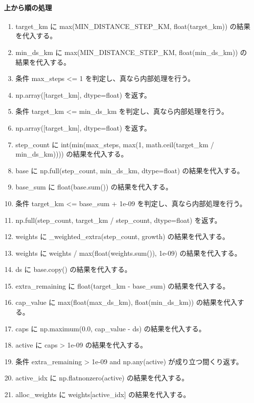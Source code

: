 \documentclass[a4paper,11pt]{article}
\begin{document}
            \paragraph{上から順の処理}
            \begin{enumerate}[leftmargin=1.8em]
            \item target\_km に max(MIN\_DISTANCE\_STEP\_KM, float(target\_km)) の結果を代入する。
\item min\_ds\_km に max(MIN\_DISTANCE\_STEP\_KM, float(min\_ds\_km)) の結果を代入する。
\item 条件 max\_steps <= 1 を判定し、真なら内部処理を行う。
\item   np.array([target\_km], dtype=float) を返す。
\item 条件 target\_km <= min\_ds\_km を判定し、真なら内部処理を行う。
\item   np.array([target\_km], dtype=float) を返す。
\item step\_count に int(min(max\_steps, max(1, math.ceil(target\_km / min\_ds\_km)))) の結果を代入する。
\item base に np.full(step\_count, min\_ds\_km, dtype=float) の結果を代入する。
\item base\_sum に float(base.sum()) の結果を代入する。
\item 条件 target\_km <= base\_sum + 1e-09 を判定し、真なら内部処理を行う。
\item   np.full(step\_count, target\_km / step\_count, dtype=float) を返す。
\item weights に \_weighted\_extra(step\_count, growth) の結果を代入する。
\item weights に weights / max(float(weights.sum()), 1e-09) の結果を代入する。
\item ds に base.copy() の結果を代入する。
\item extra\_remaining に float(target\_km - base\_sum) の結果を代入する。
\item cap\_value に max(float(max\_ds\_km), float(min\_ds\_km)) の結果を代入する。
\item caps に np.maximum(0.0, cap\_value - ds) の結果を代入する。
\item active に caps > 1e-09 の結果を代入する。
\item 条件 extra\_remaining > 1e-09 and np.any(active) が成り立つ間くり返す。
\item   active\_idx に np.flatnonzero(active) の結果を代入する。
\item   alloc\_weights に weights[active\_idx] の結果を代入する。

\end{enumerate}
\end{document}
